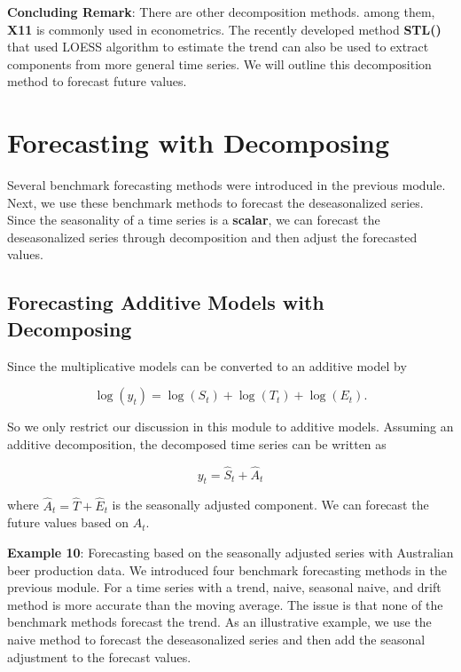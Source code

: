 \documentclass[
]{book}
\begin{document}
\textbf{Concluding Remark}: There are other decomposition methods. among them, \textbf{X11} is commonly used in econometrics. The recently developed method \textbf{STL()} that used LOESS algorithm to estimate the trend can also be used to extract components from more general time series. We will outline this decomposition method to forecast future values.

\hypertarget{forecasting-with-decomposing}{%
\section{Forecasting with Decomposing}\label{forecasting-with-decomposing}}

Several benchmark forecasting methods were introduced in the previous module. Next, we use these benchmark methods to forecast the deseasonalized series. Since the seasonality of a time series is a \textbf{scalar}, we can forecast the deseasonalized series through decomposition and then adjust the forecasted values.

\hypertarget{forecasting-additive-models-with-decomposing}{%
\subsection{Forecasting Additive Models with Decomposing}\label{forecasting-additive-models-with-decomposing}}

Since the multiplicative models can be converted to an additive model by

\[
\log(y_t) = \log(S_t) + \log(T_t) + \log(E_t).
\]

So we only restrict our discussion in this module to additive models. Assuming an additive decomposition, the decomposed time series can be written as

\[y_t = \hat{S}_t + \hat{A}_t\]

where \(\hat{A}_t = \hat{T} + \hat{E}_t\) is the seasonally adjusted component. We can forecast the future values based on \(\hat{A}_t\).

\textbf{Example 10}: Forecasting based on the seasonally adjusted series with Australian beer production data. We introduced four benchmark forecasting methods in the previous module. For a time series with a trend, naive, seasonal naive, and drift method is more accurate than the moving average. The issue is that none of the benchmark methods forecast the trend. As an illustrative example, we use the naive method to forecast the deseasonalized series and then add the seasonal adjustment to the forecast values.
\end{document}
